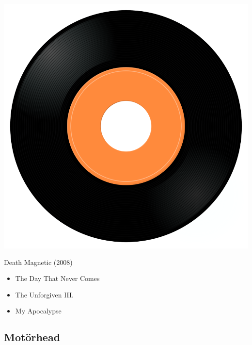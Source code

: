 \begin{minipage}[t]{0.25\textwidth}
\captionsetup{type=figure}
\includegraphics[width=\textwidth]{Images/cover.png}
\caption*{Death Magnetic (2008)}
\end{minipage}
\begin{minipage}[t]{0.25\textwidth}\vspace{0pt}
\begin{itemize}[nosep,leftmargin=1em,labelwidth=*,align=left]
	\setlength{\itemsep}{0pt}
	\item The Day That Never Comes
	\item The Unforgiven III.
	\item My Apocalypse
\end{itemize}
\end{minipage}


\subsection{Motörhead}

